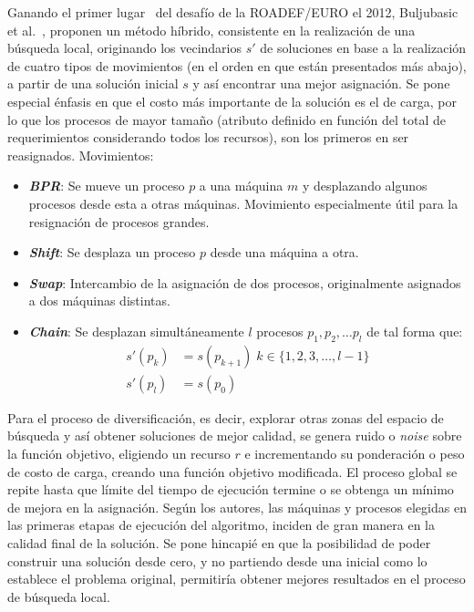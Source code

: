 \documentclass[../informe2.tex]{subfiles}
\begin{document}
Ganando el primer lugar~\cite{2012ROADEFresults} del desafío de la ROADEF/EURO el 2012, Buljubasic et al.~\cite{gavranovic2012variable}, proponen un método híbrido, consistente en la realización de una búsqueda local, originando los vecindarios $s'$ de soluciones en base a la realización de cuatro tipos de movimientos (en el orden en que están presentados más abajo), a partir de una solución inicial $s$ y así encontrar una mejor asignación. Se pone especial énfasis en que el costo más importante de la solución es el de carga, por lo que los procesos de mayor tamaño (atributo definido en función del total de requerimientos considerando todos los recursos), son los primeros en ser reasignados.
Movimientos:
\begin{itemize}
	\item \textbf{\emph{BPR}}: Se mueve un proceso $p$ a una máquina $m$ y desplazando algunos procesos desde esta a otras máquinas. Movimiento especialmente útil para la resignación de procesos grandes.
	\item \textbf{\emph{Shift}}: Se desplaza un proceso $p$ desde una máquina a otra.
	\item \textbf{\emph{Swap}}:	Intercambio de la asignación de dos procesos, originalmente asignados a dos máquinas distintas.
	\item \textbf{\emph{Chain}}: Se desplazan simultáneamente $l$ procesos $p_1, p_2, \ldots p_l$ de tal forma que:
		\begin{align}
			s'(p_k) &= s(p_{k+1}) \; k \in \{1,2,3,\ldots,l-1\} \nonumber \\
			s'(p_l) &= s(p_0) \nonumber
		\end{align}
\end{itemize}
Para el proceso de diversificación, es decir, explorar otras zonas del espacio de búsqueda y así obtener soluciones de mejor calidad, se genera ruido o \textit{noise} sobre la función objetivo, eligiendo un recurso $r$ e incrementando su ponderación o peso de costo de carga, creando una función objetivo modificada. El proceso global se repite hasta que límite del tiempo de ejecución termine o se obtenga un mínimo de mejora en la asignación. Según los autores, las máquinas y procesos elegidas en las primeras etapas de ejecución del algoritmo, inciden de gran manera en la calidad final de la solución. Se pone hincapié en que la posibilidad de poder construir una solución desde cero, y no partiendo desde una inicial como lo establece el problema original, permitiría obtener mejores resultados en el proceso de búsqueda local.\\
\end{document}
